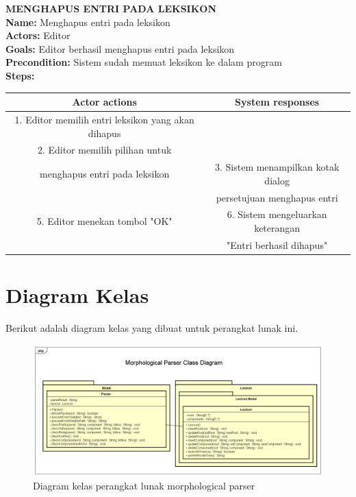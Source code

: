 \textbf{MENGHAPUS ENTRI PADA LEKSIKON}\\
\textbf{Name:} Menghapus entri pada leksikon\\
\textbf{Actors:} Editor\\
\textbf{Goals:} Editor berhasil menghapus entri pada leksikon\\
\textbf{Precondition:} Sistem sudah memuat leksikon ke dalam program\\
\textbf{Steps:}

\begin{table}[H]
\centering
\begin{tabular}{|c|c|}
\hline
\textbf{Actor actions} & \textbf{System responses} \\
\hline
1. Editor memilih entri leksikon yang akan dihapus&\\
2. Editor memilih pilihan untuk&\\ menghapus entri pada leksikon&
3. Sistem menampilkan kotak dialog \\&persetujuan menghapus entri\\
5. Editor menekan tombol "OK"&
6. Sistem mengeluarkan keterangan \\&"Entri berhasil dihapus"\\
\hline
\end{tabular}
\end{table}


\section{Diagram Kelas}
\label{sec:DiagramKelasAwal}

Berikut adalah diagram kelas yang dibuat untuk perangkat lunak ini.

\begin{figure}[H]
\centering
\includegraphics[scale=0.3]{Gambar/gambar-diagram-kelas-awal}
\caption[Diagram kelas perangkat lunak morphological parser]{Diagram kelas perangkat lunak morphological parser} 
\label{gambar-diagram-kelas-awal}
\end{figure}